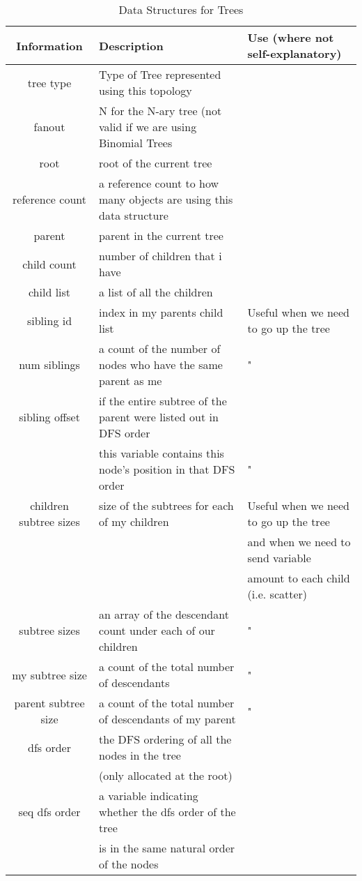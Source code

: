 \documentclass[times,10pt]{article}
\begin{document}
\begin{table}[htdp]
\caption{Data Structures for Trees}
\begin{center}
\begin{tabular}{|c|l|l|} \hline
Information & Description & Use (where not self-explanatory) \\ \hline\hline
tree type & Type of Tree represented using this topology & \\ \hline
fanout & N for the N-ary tree (not valid if we are using Binomial Trees & \\\hline
root & root of the current tree & \\\hline
reference count & a reference count to how many objects are using this data structure & \\\hline
 parent & parent in the current tree & \\ \hline
 child count & number of children that i have & \\ \hline
 child list & a list of all the children & \\ \hline
sibling id & index in my parents child list & Useful when we need to go up the tree\\ \hline
 num siblings & a count of the number of nodes who have the same parent as me & " \\ \hline
sibling offset &  if the entire subtree of the parent were listed out in DFS order& \\
&this variable contains this node's position in that DFS order& " \\ \hline
children subtree sizes & size of the subtrees for each of my children & Useful when we need to go up the tree\\
&& and when we need to send variable \\
&& amount to each child (i.e. scatter) \\ \hline
subtree sizes & an array of the descendant count under each of our children & " \\ \hline
my subtree size & a count of the total number of descendants & " \\ \hline
parent subtree size & a count of the total number of descendants of my parent& " \\ \hline
dfs order & the DFS ordering of all the nodes in the tree & \\ 
& (only allocated at the root) & \\\hline
seq dfs order & a variable indicating whether the dfs order of the tree & \\
& is in the same natural order of the nodes & \\ \hline

\end{tabular}
\end{center}
\label{tab:treeinfo}
\end{table}%
\end{document}
